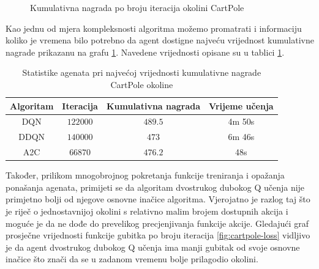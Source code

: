 \begin{figure}[H]
    \centering
    \caption{Kumulativna nagrada po broju iteracija okolini CartPole}
    \label{fig:cartpole-cumulative-reward}
\end{figure}

Kao jednu od mjera kompleksnosti algoritma možemo promatrati i informaciju koliko je vremena bilo potrebno da agent dostigne najveću vrijednost kumulativne nagrade prikazanu na grafu \ref{fig:cartpole-cumulative-reward}. Navedene vrijednosti opisane su u tablici \ref{table:cartpole-stats}.

\begin{table}[H]
    \centering
    \caption{Statistike agenata pri najvećoj vrijednosti kumulativne nagrade CartPole okoline}
    \begin{tabular}{c c c c}
        \toprule
        Algoritam & Iteracija & Kumulativna nagrada & Vrijeme učenja \\
        \midrule
        DQN & $122 000$ & $489.5$ & 4m 50s \\
        DDQN & $140 000$ & $473$ & 6m 46s \\
        A2C & $66870$ & $476.2$ & 48s \\
        \bottomrule
    \end{tabular}
    \label{table:cartpole-stats}
\end{table}

Također, prilikom mnogobrojnog pokretanja funkcije treniranja i opažanja ponašanja agenata, primijeti se da algoritam dvostrukog dubokog Q učenja nije primjetno bolji od njegove osnovne inačice algoritma. Vjerojatno je razlog taj što je riječ o jednostavnijoj okolini s relativno malim brojem dostupnih akcija i moguće je da ne dođe do prevelikog precjenjivanja funkcije akcije. Gledajući graf prosječne vrijednosti funkcije gubitka po broju iteracija \ref{fig:cartpole-loss} vidljivo je da agent dvostrukog dubokog Q učenja ima manji gubitak od svoje osnovne inačice što znači da se u zadanom vremenu bolje prilagodio okolini.

